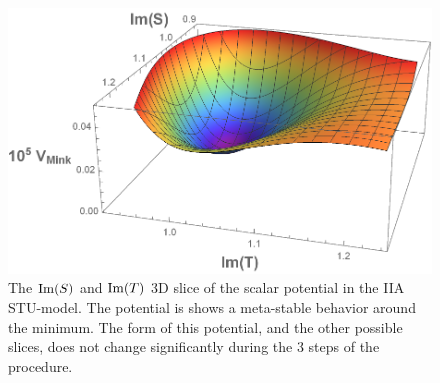 \documentclass[12pt]{report}
\def\rmim{{\rm Im}}
\begin{document}
\begin{figure}[htb]\hskip 2cm
\includegraphics[scale=0.6]{3Mod3DLarge.pdf}
\caption{ The $\rmim(S)$ and $\rmim(T)$ 3D slice of the scalar potential in the IIA STU-model. The potential is shows a meta-stable behavior around the minimum. The form of this  potential, and the other possible slices, does not change significantly during the 3 steps of the procedure.}
\label{fig:stu3Dlarge}
\end{figure}
\end{document}
